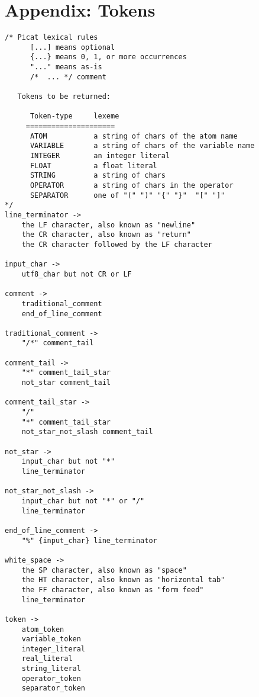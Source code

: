 
\chapter{\label{chapter:lex}Appendix: Tokens}
\begin{scriptsize}
\begin{verbatim}
/* Picat lexical rules 
      [...] means optional
      {...} means 0, 1, or more occurrences
      "..." means as-is
      /*  ... */ comment

   Tokens to be returned:

      Token-type     lexeme
     =====================
      ATOM           a string of chars of the atom name
      VARIABLE       a string of chars of the variable name
      INTEGER        an integer literal
      FLOAT          a float literal
      STRING         a string of chars 
      OPERATOR       a string of chars in the operator
      SEPARATOR      one of "(" ")" "{" "}"  "[" "]"  
*/
line_terminator ->
    the LF character, also known as "newline"
    the CR character, also known as "return"
    the CR character followed by the LF character

input_char ->
    utf8_char but not CR or LF

comment ->
    traditional_comment
    end_of_line_comment

traditional_comment ->
    "/*" comment_tail

comment_tail ->
    "*" comment_tail_star
    not_star comment_tail

comment_tail_star ->
    "/"
    "*" comment_tail_star
    not_star_not_slash comment_tail

not_star ->
    input_char but not "*"
    line_terminator

not_star_not_slash ->
    input_char but not "*" or "/"
    line_terminator

end_of_line_comment ->
    "%" {input_char} line_terminator

white_space ->
    the SP character, also known as "space"
    the HT character, also known as "horizontal tab"
    the FF character, also known as "form feed"
    line_terminator

token ->
    atom_token
    variable_token
    integer_literal
    real_literal
    string_literal
    operator_token
    separator_token


\end{verbatim}
\end{scriptsize}
